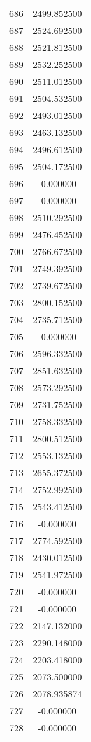 \documentclass[12pt]{article}
\begin{document}
\begin{longtable}{@{}cc@{}}
686 & 2499.852500 \\
687 & 2524.692500 \\
688 & 2521.812500 \\
689 & 2532.252500 \\
690 & 2511.012500 \\
691 & 2504.532500 \\
692 & 2493.012500 \\
693 & 2463.132500 \\
694 & 2496.612500 \\
695 & 2504.172500 \\
696 & -0.000000 \\
697 & -0.000000 \\
698 & 2510.292500 \\
699 & 2476.452500 \\
700 & 2766.672500 \\
701 & 2749.392500 \\
702 & 2739.672500 \\
703 & 2800.152500 \\
704 & 2735.712500 \\
705 & -0.000000 \\
706 & 2596.332500 \\
707 & 2851.632500 \\
708 & 2573.292500 \\
709 & 2731.752500 \\
710 & 2758.332500 \\
711 & 2800.512500 \\
712 & 2553.132500 \\
713 & 2655.372500 \\
714 & 2752.992500 \\
715 & 2543.412500 \\
716 & -0.000000 \\
717 & 2774.592500 \\
718 & 2430.012500 \\
719 & 2541.972500 \\
720 & -0.000000 \\
721 & -0.000000 \\
722 & 2147.132000 \\
723 & 2290.148000 \\
724 & 2203.418000 \\
725 & 2073.500000 \\
726 & 2078.935874 \\
727 & -0.000000 \\
728 & -0.000000 \\

\end{longtable}
\end{document}
